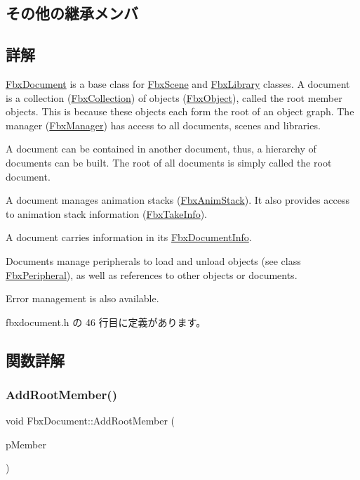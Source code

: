 \subsection*{その他の継承メンバ}


\subsection{詳解}
\hyperlink{class_fbx_document}{Fbx\+Document} is a base class for \hyperlink{class_fbx_scene}{Fbx\+Scene} and \hyperlink{class_fbx_library}{Fbx\+Library} classes. A document is a collection (\hyperlink{class_fbx_collection}{Fbx\+Collection}) of objects (\hyperlink{class_fbx_object}{Fbx\+Object}), called the root member objects. This is because these objects each form the root of an object graph. The manager (\hyperlink{class_fbx_manager}{Fbx\+Manager}) has access to all documents, scenes and libraries.

A document can be contained in another document, thus, a hierarchy of documents can be built. The root of all documents is simply called the root document.

A document manages animation stacks (\hyperlink{class_fbx_anim_stack}{Fbx\+Anim\+Stack}). It also provides access to animation stack information (\hyperlink{class_fbx_take_info}{Fbx\+Take\+Info}).

A document carries information in its \hyperlink{class_fbx_document_info}{Fbx\+Document\+Info}.

Documents manage peripherals to load and unload objects (see class \hyperlink{class_fbx_peripheral}{Fbx\+Peripheral}), as well as references to other objects or documents.

Error management is also available. 

 fbxdocument.\+h の 46 行目に定義があります。



\subsection{関数詳解}
\mbox{\label{class_fbx_document_a61a00187fc94a643db607720d336ffc8}} 
\subsubsection{\texorpdfstring{Add\+Root\+Member()}{AddRootMember()}}
{\footnotesize\ttfamily void Fbx\+Document\+::\+Add\+Root\+Member (\begin{DoxyParamCaption}\item[{\hyperlink{class_fbx_object}{Fbx\+Object} $\ast$}]{p\+Member }\end{DoxyParamCaption})\hspace{0.3cm}{\ttfamily [inline]}}

